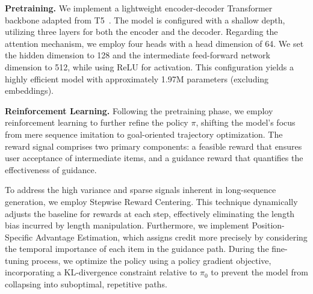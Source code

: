 \begin{table}[t!]
  \centering
  \caption{Experimental Results on Different Datasets}
  \label{tab:ablation_dataprocess}
\end{table}

\textbf{Pretraining.} We implement a lightweight encoder-decoder Transformer backbone adapted from T5~\cite{raffel2020exploring}. The model is configured with a shallow depth, utilizing three layers for both the encoder and the decoder. Regarding the attention mechanism, we employ four heads with a head dimension of 64. We set the hidden dimension to 128 and the intermediate feed-forward network dimension to 512, while using ReLU for activation. This configuration yields a highly efficient model with approximately 1.97M parameters (excluding embeddings).

\textbf{Reinforcement Learning.} Following the pretraining phase, we employ reinforcement learning to further refine the policy $\pi$, shifting the model's focus from mere sequence imitation to goal-oriented trajectory optimization. The reward signal comprises two primary components: a feasible reward that ensures user acceptance of intermediate items, and a guidance reward that quantifies the effectiveness of guidance.

To address the high variance and sparse signals inherent in long-sequence generation, we employ Stepwise Reward Centering. This technique dynamically adjusts the baseline for rewards at each step, effectively eliminating the length bias incurred by length manipulation. Furthermore, we implement Position-Specific Advantage Estimation, which assigns credit more precisely by considering the temporal importance of each item in the guidance path. During the fine-tuning process, we optimize the policy using a policy gradient objective, incorporating a KL-divergence constraint relative to $\pi_0$ to prevent the model from collapsing into suboptimal, repetitive paths.

